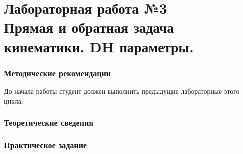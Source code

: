 \documentclass[12pt,a4paper,openany]{extarticle}
\begin{document}
\part*{Лабораторная работа №3\\ Прямая и обратная задача кинематики. DH параметры.}
\section{Методические рекомендации}
\hspace*{\parindent}До начала работы студент должен выполнить предыдущие лабораторные этого цикла.

\section{Теоретические сведения}

 



\section{Практическое задание}


\end{document}
